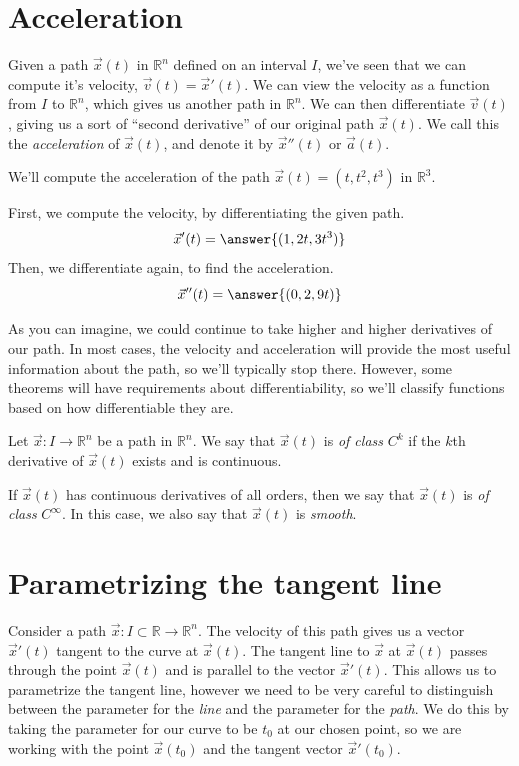 \documentclass{ximera}
\begin{document}
\section*{Acceleration}

Given a path $\vec{x}(t)$ in $\mathbb{R}^n$ defined on an interval $I$, we've seen that we can compute it's velocity, $\vec{v}(t) = \vec{x}'(t)$. We can view the velocity as a function from $I$ to $\mathbb{R}^n$, which gives us another path in $\mathbb{R}^n$. We can then differentiate $\vec{v}(t)$, giving us a sort of ``second derivative'' of our original path $\vec{x}(t)$. We call this the \emph{acceleration} of $\vec{x}(t)$, and denote it by $\vec{x}''(t)$ or $\vec{a}(t)$.

\begin{example}
We'll compute the acceleration of the path $\vec{x}(t) = (t,t^2,t^3)$ in $\mathbb{R}^3$.

First, we compute the velocity, by differentiating the given path.
\[
\vec{x}'(t) = \answer{(1,2t,3t^3)}
\]
Then, we differentiate again, to find the acceleration.
\[
\vec{x}''(t) = \answer{(0,2,9t)}
\]
\end{example}

As you can imagine, we could continue to take higher and higher derivatives of our path. In most cases, the velocity and acceleration will provide the most useful information about the path, so we'll typically stop there. However, some theorems will have requirements about differentiability, so we'll classify functions based on how differentiable they are.

\begin{definition}
Let $\vec{x}:I\rightarrow\mathbb{R}^n$ be a path in $\mathbb{R}^n$. We say that $\vec{x}(t)$ is \emph{of class} $C^k$ if the $k$th derivative of $\vec{x}(t)$ exists and is continuous.

If $\vec{x}(t)$ has continuous derivatives of all orders, then we say that $\vec{x}(t)$ is \emph{of class} $C^{\infty}$. In this case, we also say that $\vec{x}(t)$ is \emph{smooth}.
\end{definition}


\section*{Parametrizing the tangent line}

Consider a path $\vec{x}:I\subset\mathbb{R}\rightarrow\mathbb{R}^n$. The velocity of this path gives us a vector $\vec{x}'(t)$ tangent to the curve at $\vec{x}(t)$. The tangent line to $\vec{x}$ at $\vec{x}(t)$ passes through the point $\vec{x}(t)$ and is parallel to the vector $\vec{x}'(t)$. This allows us to parametrize the tangent line, however we need to be very careful to distinguish between the parameter for the \emph{line} and the parameter for the \emph{path}. We do this by taking the parameter for our curve to be $t_0$ at our chosen point, so we are working with the point $\vec{x}(t_0)$ and the tangent vector $\vec{x}'(t_0)$.
\end{document}
